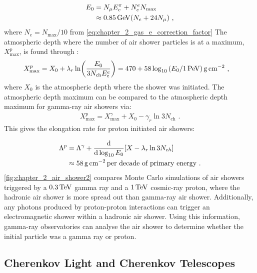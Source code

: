 \begin{equation}
    \begin{aligned}
    E_0&=N_\mu E_c^\pi + N_c^e N_\text{max} \\
 &\approx 0.85\,\si{\giga\electronvolt}\qty(N_e+24 N_\mu)\text{ ,}
    \end{aligned}
\end{equation}
\noindent where $N_e=N_\text{max}/10$ from \autoref{eq:chapter_2_gas_e_correction_factor}
\newpar
The atmospheric depth where the number of air shower particles is at a maximum, $X_\text{max}^p$, is found through \citep{MATTHEWS2005387}:
\begin{equation}
    \begin{aligned}
    X_\text{max}^p&= X_0 + \lambda_r\ln(\frac{E_0}{3N_\text{ch}E_c^e}) =470+58\log_{10}\qty(E_0/1\,\PeV)\,\grampercentimetresquared \text{ ,}  
    \end{aligned}
\end{equation}
\noindent where $X_0$ is the atmospheric depth where the shower was initiated. The atmospheric depth maximum can be compared to the atmospheric depth maximum for gamma-ray air showers via:
\begin{equation}
    \begin{aligned}
    X_\text{max}^p=X_\text{max}^\gamma+X_0-\gamma_r\ln 3N_\text{ch}\text{ .}
    \end{aligned}
\end{equation}
\noindent This gives the elongation rate for proton initiated air showers:

\begin{equation}
    \begin{aligned}
    \Lambda^p &= \Lambda^\gamma + \dv{ }{\log_{10}E_0}\qty[X-\lambda_r\ln 3N_{ch}] \\
    &\approx 58\,\si{\gram\per\centi\meter\squared}\,\text{per decade of primary energy}\text{ .}
    \end{aligned}
\end{equation}
\noindent \autoref{fig:chapter_2_air_shower2} compares Monte Carlo simulations of air showers triggered by a $0.3\,\TeV$ gamma ray and a $1\,\TeV$ cosmic-ray proton, where the hadronic air shower is more spread out than gamma-ray air shower. Additionally, any photons produced by proton-proton interactions can trigger an electromagnetic shower within a hadronic air shower. Using this information, gamma-ray observatories can analyse the air shower to determine whether the initial particle was a gamma ray or proton.

\subsection{Cherenkov Light and Cherenkov Telescopes}


